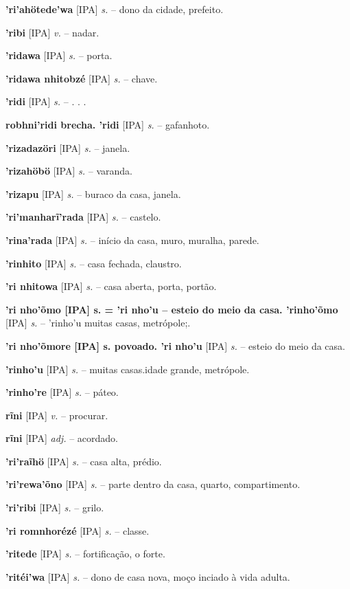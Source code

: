 \textbf{'ri'ahötede'wa} [IPA] \textit{s.} -- dono da cidade, prefeito.

\textbf{'ribi} [IPA] \textit{v.} -- nadar.

\textbf{'ridawa} [IPA] \textit{s.} -- porta.

\textbf{'ridawa nhitobzé} [IPA] \textit{s.} -- chave.

\textbf{'ridi} [IPA] \textit{s.} -- . . .

\textbf{robhni'ridi brecha. 'ridi} [IPA] \textit{s.} -- gafanhoto.

\textbf{'rizadazöri} [IPA] \textit{s.} -- janela.

\textbf{'rizahöbö} [IPA] \textit{s.} -- varanda.

\textbf{'rizapu} [IPA] \textit{s.} -- buraco da casa, janela.

\textbf{'ri'manharĩ'rada} [IPA] \textit{s.} -- castelo.

\textbf{'rina'rada} [IPA] \textit{s.} -- início da casa, muro, muralha, parede.

\textbf{'rinhito} [IPA] \textit{s.} -- casa fechada, claustro.

\textbf{'ri nhitowa} [IPA] \textit{s.} -- casa aberta, porta, portão.

\textbf{'ri nho'õmo [IPA] s. = 'ri nho'u -- esteio do meio da casa. 'rinho'õmo} [IPA] \textit{s.} -- 'rinho'u muitas casas, metrópole;.

\textbf{'ri nho'õmore [IPA] s. povoado. 'ri nho'u} [IPA] \textit{s.} -- esteio do meio da casa.

\textbf{'rinho'u} [IPA] \textit{s.} -- muitas casas.idade grande, metrópole.

\textbf{'rinho're} [IPA] \textit{s.} -- páteo.

\textbf{rĩni} [IPA] \textit{v.} -- procurar.

\textbf{rĩni} [IPA] \textit{adj.} -- acordado.

\textbf{'ri'raĩhö} [IPA] \textit{s.} -- casa alta, prédio.

\textbf{'ri'rewa'õno} [IPA] \textit{s.} -- parte dentro da casa, quarto, compartimento.

\textbf{'ri'ribi} [IPA] \textit{s.} -- grilo.

\textbf{'ri romnhorézé} [IPA] \textit{s.} -- classe.

\textbf{'ritede} [IPA] \textit{s.} -- fortificação, o forte.

\textbf{'ritéi'wa} [IPA] \textit{s.} -- dono de casa nova, moço inciado à vida adulta.

